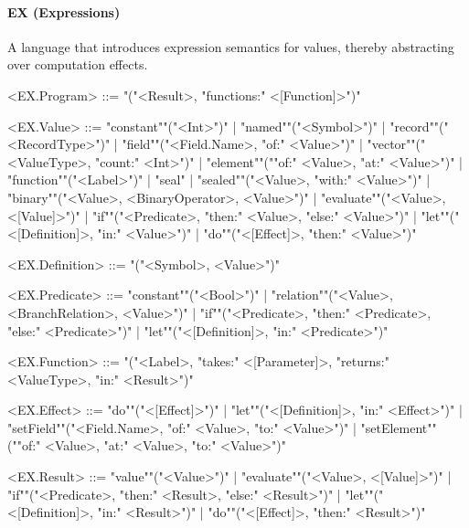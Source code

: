 \documentclass[main.tex]{subfiles}
\begin{document}
\paragraph{ EX (Expressions) } A language that introduces expression semantics for values, thereby abstracting over computation effects.
\begin{grammar}
	\footnotesize
				<EX.Program> ::=
							"("<Result>, "functions:" <[Function]>")"
				\par
				<EX.Value> ::=
						"constant""("<Int>")"
						| "named""("<Symbol>")"
						| "record""("<RecordType>")"
						| "field""("<Field.Name>, "of:" <Value>")"
						| "vector""("<ValueType>, "count:" <Int>")"
						| "element""(""of:" <Value>, "at:" <Value>")"
						| "function""("<Label>")"
						| "seal"
						| "sealed""("<Value>, "with:" <Value>")"
						| "binary""("<Value>, <BinaryOperator>, <Value>")"
						| "evaluate""("<Value>, <[Value]>")"
						| "if""("<Predicate>, "then:" <Value>, "else:" <Value>")"
						| "let""("<[Definition]>, "in:" <Value>")"
						| "do""("<[Effect]>, "then:" <Value>")"
				\par
				<EX.Definition> ::=
							"("<Symbol>, <Value>")"
				\par
				<EX.Predicate> ::=
						"constant""("<Bool>")"
						| "relation""("<Value>, <BranchRelation>, <Value>")"
						| "if""("<Predicate>, "then:" <Predicate>, "else:" <Predicate>")"
						| "let""("<[Definition]>, "in:" <Predicate>")"
				\par
				<EX.Function> ::=
							"("<Label>, "takes:" <[Parameter]>, "returns:" <ValueType>, "in:" <Result>")"
				\par
				<EX.Effect> ::=
						"do""("<[Effect]>")"
						| "let""("<[Definition]>, "in:" <Effect>")"
						| "setField""("<Field.Name>, "of:" <Value>, "to:" <Value>")"
						| "setElement""(""of:" <Value>, "at:" <Value>, "to:" <Value>")"
				\par
				<EX.Result> ::=
						"value""("<Value>")"
						| "evaluate""("<Value>, <[Value]>")"
						| "if""("<Predicate>, "then:" <Result>, "else:" <Result>")"
						| "let""("<[Definition]>, "in:" <Result>")"
						| "do""("<[Effect]>, "then:" <Result>")"
				\par
\end{grammar}
\par
\end{document}
